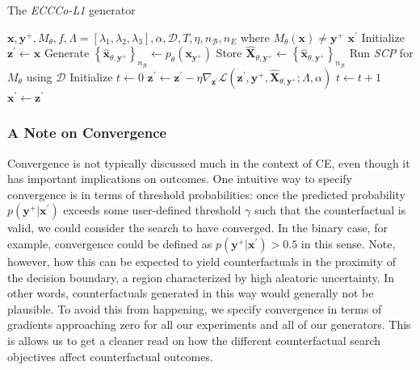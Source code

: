 \begin{algorithm*}[h]
  \caption{The \textit{ECCCo-L1} generator}\label{alg:eccco-l1}
  \begin{algorithmic}[1]
    \Require $\mathbf{x}, \mathbf{y}^+, M_{\theta}, f, \Lambda=[\lambda_1,\lambda_2,\lambda_3], \alpha, \mathcal{D}, T, \eta, n_{\mathcal{B}}, n_E$ where $M_{\theta}(\mathbf{x})\neq\mathbf{y}^+$
    \Ensure $\mathbf{x}^\prime$
    \State Initialize $\mathbf{z}^\prime \gets \mathbf{x}$ 
    \State Generate $\left\{\hat{\mathbf{x}}_{\theta,\mathbf{y}^+}\right\}_{n_{\mathcal{B}}} \gets p_{\theta}(\mathbf{x}_{\mathbf{y}^+})$ 
    \State Store $\widehat{\mathbf{X}}_{\theta,\mathbf{y}^+} \gets \left\{\hat{\mathbf{x}}_{\theta,\mathbf{y}^+}\right\}_{n_{\mathcal{B}}}$ 
    \State Run \textit{SCP} for $M_{\theta}$ using $\mathcal{D}$ 
    \State Initialize $t \gets 0$
     
    \State $\mathbf{z}^\prime \gets \mathbf{z}^\prime - \eta \nabla_{\mathbf{z}^\prime} \mathcal{L}(\mathbf{z}^\prime,\mathbf{y}^+,\widehat{\mathbf{X}}_{\theta,\mathbf{y}^+}; \Lambda, \alpha)$ 
    \State $t \gets t+1$
    \EndWhile
    \State $\mathbf{x}^\prime \gets \mathbf{z}^\prime$
  \end{algorithmic}
\end{algorithm*}

\subsubsection{A Note on Convergence}\label{convergence}

Convergence is not typically discussed much in the context of CE, even though it has important implications on outcomes. One intuitive way to specify convergence is in terms of threshold probabilities: once the predicted probability $p(\mathbf{y}^+|\mathbf{x}^{\prime})$ exceeds some user-defined threshold $\gamma$ such that the counterfactual is valid, we could consider the search to have converged. In the binary case, for example, convergence could be defined as $p(\mathbf{y}^+|\mathbf{x}^{\prime})>0.5$ in this sense. Note, however, how this can be expected to yield counterfactuals in the proximity of the decision boundary, a region characterized by high aleatoric uncertainty. In other words, counterfactuals generated in this way would generally not be plausible. To avoid this from happening, we specify convergence in terms of gradients approaching zero for all our experiments and all of our generators. This is allows us to get a cleaner read on how the different counterfactual search objectives affect counterfactual outcomes. 

